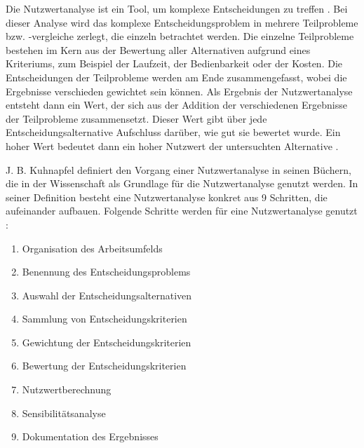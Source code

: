 Die Nutzwertanalyse ist ein Tool, um komplexe Entscheidungen zu treffen \cite[S. 1 ff.]{kuhnapfel_nutzwertanalysen_2014}. Bei dieser Analyse wird das komplexe Entscheidungsproblem in mehrere Teilprobleme bzw. -vergleiche zerlegt, die einzeln betrachtet werden. Die einzelne Teilprobleme bestehen im Kern aus der Bewertung aller Alternativen aufgrund eines Kriteriums, zum Beispiel der Laufzeit, der Bedienbarkeit oder der Kosten. Die Entscheidungen der Teilprobleme werden am Ende zusammengefasst, wobei die Ergebnisse verschieden gewichtet sein können. Als Ergebnis der Nutzwertanalyse entsteht dann ein Wert, der sich aus der Addition der verschiedenen Ergebnisse der Teilprobleme zusammensetzt. Dieser Wert gibt über jede Entscheidungsalternative Aufschluss darüber, wie gut sie bewertet wurde. Ein hoher Wert bedeutet dann ein hoher Nutzwert der untersuchten Alternative \cite[S. 89 f.]{kuhnapfel_vertriebscontrolling_2013}. 

J. B. Kuhnapfel definiert den Vorgang einer Nutzwertanalyse in seinen Büchern, die in der Wissenschaft als Grundlage für die Nutzwertanalyse genutzt werden. In seiner Definition besteht eine Nutzwertanalyse konkret aus 9 Schritten, die aufeinander aufbauen. Folgende Schritte werden für eine Nutzwertanalyse genutzt \cite{kuhnapfel_vertriebscontrolling_2013} \cite{kuhnapfel_nutzwertanalysen_2014} \cite{kuhnapfel_scoring_2021}:

\begin{enumerate}
    \item Organisation des Arbeitsumfelds
    \item Benennung des Entscheidungsproblems
    \item Auswahl der Entscheidungsalternativen
    \item Sammlung von Entscheidungskriterien
    \item Gewichtung der Entscheidungskriterien
    \item Bewertung der Entscheidungskriterien
    \item Nutzwertberechnung
    \item Sensibilitätsanalyse
    \item Dokumentation des Ergebnisses
\end{enumerate}